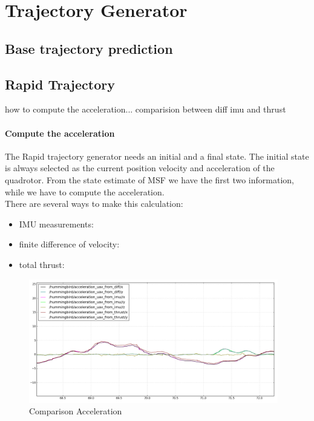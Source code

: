 \chapter{Trajectory Generator}\label{chap:trajectory_generator}

\section{Base trajectory prediction}

\section{Rapid Trajectory}
how to compute the acceleration...
comparision between diff imu and thrust
\subsubsection{Compute the acceleration}
The Rapid trajectory generator needs an initial and a final state. The initial state is always selected as the current position velocity and acceleration of the quadrotor. From the state estimate of MSF we have the first two information, while we have to compute the acceleration.\\
There are several ways to make this calculation:
\begin{itemize}
\item IMU measurements:
\item finite difference of velocity:
\item total thrust:
\end{itemize}

\begin{figure}[!ht]
    \centering
    \includegraphics[width=0.97\textwidth]{img/comparison_acc.png}
    \caption{Comparison Acceleration}
    \label{fig:comparison_acc}
\end{figure}

